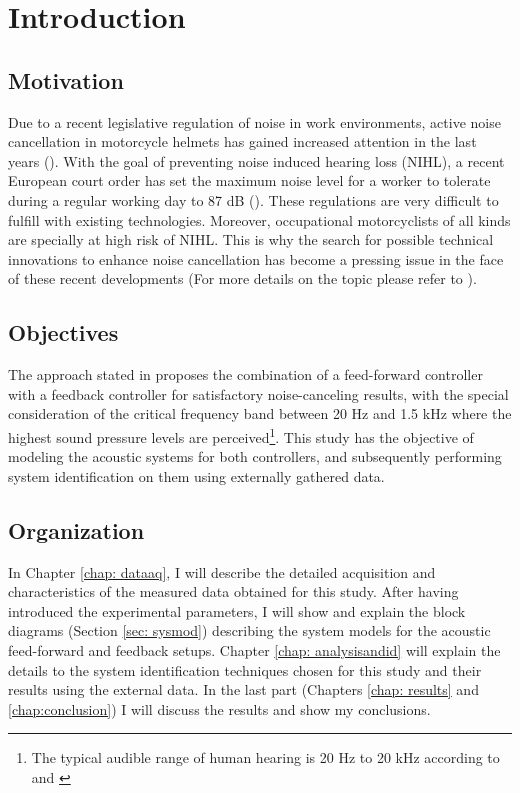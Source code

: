 


\chapter{Introduction}

\section{Motivation}
Due to a recent legislative regulation of noise in work environments, active noise cancellation in motorcycle helmets has gained increased attention in the last years (\cite{castae2010active}). With the goal of preventing noise induced hearing loss (NIHL), a recent European court order has set the maximum noise level for a worker to tolerate during a regular working day to 87 dB (\cite{castae2010active}). These regulations are very difficult to fulfill with existing technologies. Moreover, occupational motorcyclists of all kinds are specially at high risk of NIHL. This is why the search for possible technical innovations to enhance noise cancellation has become a pressing issue in the face of these recent developments (For more details on the topic please refer to \cite{castae2010active}). 

\section{Objectives}

The approach stated in \cite{castae2010active} proposes the combination of a feed-forward controller with a feedback controller for satisfactory noise-canceling results, with the special consideration of the critical frequency band between 20 Hz and 1.5 kHz where the highest sound pressure levels are perceived\footnote[1]{The typical audible range of human hearing is 20 Hz to 20 kHz according to \cite{castae2010active} and \cite{esnaola2005mirela}}. This study has the objective of modeling the acoustic systems for both controllers, and subsequently performing system identification on them using externally gathered data.

\section{Organization}

In Chapter \ref{chap: dataaq}, I will describe the detailed acquisition and characteristics of the measured data obtained for this study. After having introduced the experimental parameters, I will show and explain the block diagrams (Section \ref{sec: sysmod}) describing the system models for the acoustic feed-forward and feedback setups. Chapter \ref{chap: analysisandid} will explain the details to the system identification techniques chosen for this study and their results using the external data. In the last part (Chapters \ref{chap: results} and \ref{chap:conclusion}) I will discuss the results and show my conclusions.


